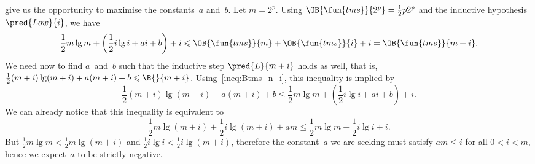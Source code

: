give us the opportunity to maximise the constants~\(a\)
and~\(b\). Let \(m=2^p\). Using
\(\OB{\fun{tms}}{2^p} = \tfrac{1}{2}p2^p\) and the inductive
hypothesis \(\pred{Low}{i}\), we have
\begin{equation}
\frac{1}{2}m\lg m + \left(\frac{1}{2}i\lg i + ai + b\right) + i
\leqslant
\OB{\fun{tms}}{m} + \OB{\fun{tms}}{i} + i = \OB{\fun{tms}}{m+i}.
\label{ineq:Btms_n_i}
\end{equation}
We need now to find \(a\)~and~\(b\) such that the inductive step
\(\pred{L}{m+i}\) holds as well, that is,
\(\tfrac{1}{2}(m+i)\lg(m+i) + a(m+i) + b \leqslant \B{}{m+i}\).
Using~\eqref{ineq:Btms_n_i}, this inequality is implied by
\begin{equation*}
\frac{1}{2}(m+i)\lg(m+i) + a(m+i) + b
\leqslant
\frac{1}{2}m\lg m + \left(\frac{1}{2}i\lg i + ai + b\right) + i.
\end{equation*}
We can already notice that this inequality is equivalent to
\begin{equation}
\frac{1}{2}m\lg(m+i) + \frac{1}{2}i\lg(m+i) + am
\leqslant \frac{1}{2}m\lg m + \frac{1}{2}i\lg i + i.
\label{ineq:Btms_n_i_details}
\end{equation}
But \(\tfrac{1}{2}m\lg m < \tfrac{1}{2}m\lg(m+i)\) and
\(\tfrac{1}{2}i\lg i < \tfrac{1}{2}i\lg(m+i)\), therefore the
constant~\(a\) we are seeking must satisfy \(am \leqslant i\) for all
\(0 < i < m\), hence we expect~\(a\) to be strictly negative.

